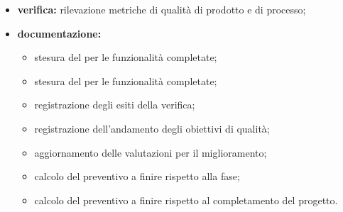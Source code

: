 \begin{itemize}
 	\item \textbf{verifica:} rilevazione metriche di qualità di prodotto e di processo;
	\item \textbf{documentazione:} 
	 \begin{itemize}
		\item stesura del \MU{} per le funzionalità completate;
		\item stesura del \MA{} per le funzionalità completate;
  		\item registrazione degli esiti della verifica;
     	\item registrazione dell’andamento degli obiettivi di qualità;
		\item aggiornamento delle valutazioni per il miglioramento; 
		\item calcolo del preventivo a finire rispetto alla fase;
		\item calcolo del preventivo a finire rispetto al completamento del progetto.
	 \end{itemize}
\end{itemize}

\pagebreak

